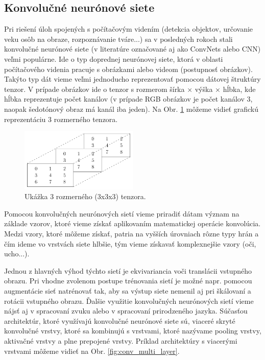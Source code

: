 \subsection{Konvolučné neurónové siete}

Pri riešení úloh spojených s počítačovým videním (detekcia objektov, určovanie veku
osôb na obraze, rozpoznávanie tváre...) sa v posledných rokoch stali konvolučné neurónové siete (v literatúre označované aj ako ConvNets alebo CNN) veľmi populárne.
Ide o typ doprednej neurónovej siete, ktorá v oblasti počítačového videnia
pracuje s obrázkami alebo videom (postupnosť obrázkov). Takýto typ dát vieme veľmi
jednoducho reprezentovať pomocou dátovej štruktúry tenzor. V prípade obrázkov ide o
tenzor s rozmerom šírka × výška × hĺbka, kde hĺbka reprezentuje počet kanálov (v prípade RGB obrázkov je počet kanálov 3, naopak šedotónový obraz má kanál iba jeden). Na Obr. \ref{fig:tenzor} môžeme vidieť grafickú reprezentáciu 3 rozmerného tenzora.

\begin{figure}[H]
\centerline{\includegraphics[width=0.5\textwidth]{images/tenzor.png}}
\caption{Ukážka 3 rozmerného (3x3x3) tenzora.}
\label{fig:tenzor}
\end{figure}

Pomocou konvolučných neurónových sietí vieme priradiť dátam význam na základe
vzorov, ktoré vieme získať aplikovaním matematickej operácie konvolúcia. Medzi vzory,
ktoré môžeme získať, patria na vyšších úrovniach rôzne typy hrán a čím ideme vo
vrstvách siete hlbšie, tým vieme získavať komplexnejšie vzory (oči, ucho...).

Jednou z hlavných výhod týchto sietí je ekvivariancia voči translácii vstupného
obrazu. Pri vhodne zvolenom postupe trénovania sietí je možné napr. pomocou augmentácie sieť natrénovať tak, aby sa výstup siete nemenil aj pri škálovaní a rotácii
vstupného obrazu. Ďalšie využitie konvolučných neurónových sietí vieme nájsť aj v
spracovaní zvuku alebo v spracovaní prirodzeného jazyka.
Súčasťou architektúr, ktoré využívajú konvolučné neurónové siete sú,
viaceré skryté konvolučné vrstvy, ktoré sa kombinujú s vrstvami, ktoré nazývame pooling vrstvy, aktivačné vrstvy a plne prepojené vrstvy. Príklad architektúry s viacerými
vrstvami môžeme vidieť na Obr. \ref{fig:conv_multi_layer}.

